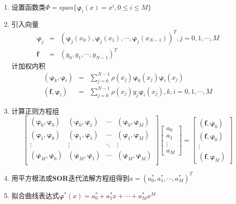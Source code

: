 \documentclass[a4paper,11pt]{article}
\begin{document}
	\begin{enumerate}[(1)]
		\item 设置函数类$\Phi=span\{\boldsymbol{\varphi}_i(x)=x^i, 0\leqslant{}i\leqslant{}M\}$
		\item 引入向量
			\begin{eqnarray}
				\boldsymbol{\varphi}_j & = & (\boldsymbol{\varphi}_j(x_0),\boldsymbol{\varphi}_j(x_1),\cdots,\boldsymbol{\varphi}_j(x_{\scriptscriptstyle N-1}))^T,j=0,1,\cdots,M \nonumber\\
				\boldsymbol{f} & = & (y_0,y_1,\cdots,y_{\scriptscriptstyle N-1})^T \nonumber
			\end{eqnarray}		
			计加权内积
			\begin{eqnarray}
				(\boldsymbol{\varphi}_k,\boldsymbol{\varphi}_i) & = & \sum\limits_{j=0}^{N-1}\rho(x_j)\boldsymbol{\varphi}_k(x_j)\boldsymbol{\varphi}_i(x_j) \nonumber\\
				(\boldsymbol{f},\boldsymbol{\varphi}_i) & = & \sum\limits_{j=0}^{N-1}\rho(x_j)y_j\boldsymbol{\varphi}_i(x_j),k,i=0,1,\cdots,M \nonumber
			\end{eqnarray}
		\item 计算正则方程组
			\begin{displaymath}
				\left[
				\begin{array}{cccc}
				(\boldsymbol{\varphi}_0,\boldsymbol{\varphi}_0) & (\boldsymbol{\varphi}_0,\boldsymbol{\varphi}_1) & \cdots & (\boldsymbol{\varphi}_0,\boldsymbol{\varphi}_{\scriptscriptstyle M}) \\
			    (\boldsymbol{\varphi}_1,\boldsymbol{\varphi}_0) & (\boldsymbol{\varphi}_1,\boldsymbol{\varphi}_1) & \cdots & (\boldsymbol{\varphi}_1,\boldsymbol{\varphi}_{\scriptscriptstyle M}) \\
			    \vdots & \vdots & \ddots & \vdots \\
			    (\boldsymbol{\varphi}_{\scriptscriptstyle M},\boldsymbol{\varphi}_0) & (\boldsymbol{\varphi}_{\scriptscriptstyle M},\boldsymbol{\varphi}_1) & \cdots & (\boldsymbol{\varphi}_{\scriptscriptstyle M},\boldsymbol{\varphi}_{\scriptscriptstyle M}) \\
				\end{array}
				\right]\left[
				\begin{array}{c}
				a_0 \\ a_1 \\ \vdots \\ a_{\scriptscriptstyle M}
				\end{array}
				\right]=\left[
				\begin{array}{c}
				(\boldsymbol{f},\boldsymbol{\varphi}_0) \\ (\boldsymbol{f},\boldsymbol{\varphi}_0) \\ \vdots \\ (\boldsymbol{f},\boldsymbol{\varphi}_{\scriptscriptstyle M})
				\end{array}
				\right]
			\end{displaymath}
		\item 用平方根法或\textbf{SOR}迭代法解方程组得到$a=(a_0^*,a_1^*,\cdots,a_{\scriptscriptstyle M}^*)^T$
		\item 拟合曲线表达式$\boldsymbol{\varphi}^*(x)=a_0^*+a_1^*x+\cdots+a_{\scriptscriptstyle M}^{*}x^{\scriptscriptstyle M}$
	\end{enumerate}
\end{document}
